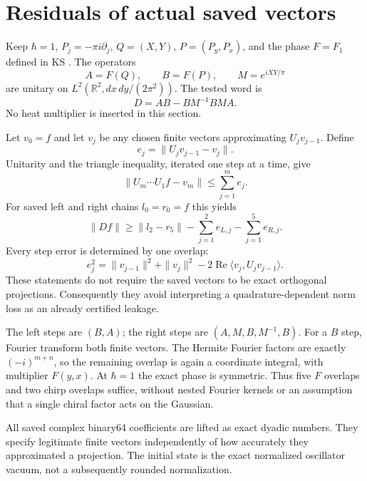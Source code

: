 \documentclass[11pt,a4paper]{article}
\newcommand{\R}{\mathbb R}
\begin{document}
\newpage
\section{Residuals of actual saved vectors}
Keep $\hbar=1$, $P_j=-\pi i\partial_j$, $Q=(X,Y)$,
$P=(P_y,P_x)$, and the phase $F=F_1$ defined in KS \cite{ks}.
The operators
\[
 A=F(Q),\qquad B=F(P),\qquad M=e^{iXY/\pi}
\]
are unitary on $L^2(\R^2,dx\,dy/(2\pi^2))$. The tested word is
\[
 D=AB-BM^{-1}BMA .
\]
No heat multiplier is inserted in this section.

Let $v_0=f$ and let $v_j$ be any chosen finite vectors approximating
$U_jv_{j-1}$. Define
\[
 e_j=\|U_jv_{j-1}-v_j\|.
\]
Unitarity and the triangle inequality, iterated one step at a time, give
\[
 \|U_m\cdots U_1f-v_m\|\le\sum_{j=1}^m e_j .
\]
For saved left and right chains $l_0=r_0=f$ this yields
\begin{equation}
 \|Df\|\ge \|l_2-r_5\|-\sum_{j=1}^2e_{L,j}
                           -\sum_{j=1}^5e_{R,j}.                 \label{bound}
\end{equation}
Every step error is determined by one overlap:
\begin{equation}
 e_j^2=\|v_{j-1}\|^2+\|v_j\|^2
            -2\operatorname{Re}\langle v_j,U_jv_{j-1}\rangle .
                                                               \label{step}
\end{equation}
These statements do not require the saved vectors to be exact
orthogonal projections. Consequently they avoid interpreting a
quadrature-dependent norm loss as an already certified leakage.

The left steps are $(B,A)$; the right steps are $(A,M,B,M^{-1},B)$.
For a $B$ step, Fourier transform both finite vectors. The Hermite
Fourier factors are exactly $(-i)^{m+n}$, so the remaining overlap is
again a coordinate integral, with multiplier $F(y,x)$. At $\hbar=1$
the exact phase is symmetric. Thus five $F$ overlaps and two chirp
overlaps suffice, without nested Fourier kernels or an assumption
that a single chiral factor acts on the Gaussian.

All saved complex binary64 coefficients are lifted as exact dyadic
numbers. They specify legitimate finite vectors independently of how
accurately they approximated a projection. The initial state is the
exact normalized oscillator vacuum, not a subsequently rounded
normalization.

\newpage
\end{document}
